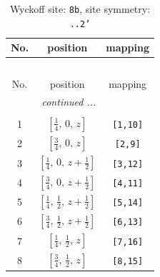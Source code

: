 \documentclass[fleqn,8pt]{jsarticle}
\begin{document}
\begin{longtable}{ccc}
\caption{Wyckoff site: {\tt 8b}, site symmetry: {\tt ..2'}}
 \\
 \hline \hline
No. & position & mapping \\ \hline \endfirsthead

\multicolumn{2}{l}{\tablename\ \thetable{}} \\
 \hline \hline
No. & position & mapping \\ \hline \endhead

 \hline \hline
\multicolumn{2}{r}{\footnotesize\it continued ...} \\ \endfoot

 \hline \hline
\multicolumn{2}{r}{} \\ \endlastfoot

1 & $\left[ \frac{1}{4},\, 0,\, z \right]$ & {\tt [1,10]} \\ \hline
2 & $\left[ \frac{3}{4},\, 0,\, z \right]$ & {\tt [2,9]} \\ \hline
3 & $\left[ \frac{1}{4},\, 0,\, z + \frac{1}{2} \right]$ & {\tt [3,12]} \\ \hline
4 & $\left[ \frac{3}{4},\, 0,\, z + \frac{1}{2} \right]$ & {\tt [4,11]} \\ \hline
5 & $\left[ \frac{1}{4},\, \frac{1}{2},\, z + \frac{1}{2} \right]$ & {\tt [5,14]} \\ \hline
6 & $\left[ \frac{3}{4},\, \frac{1}{2},\, z + \frac{1}{2} \right]$ & {\tt [6,13]} \\ \hline
7 & $\left[ \frac{1}{4},\, \frac{1}{2},\, z \right]$ & {\tt [7,16]} \\ \hline
8 & $\left[ \frac{3}{4},\, \frac{1}{2},\, z \right]$ & {\tt [8,15]} \\
\end{longtable}
\renewcommand{\arraystretch}{1.2}
\end{document}
